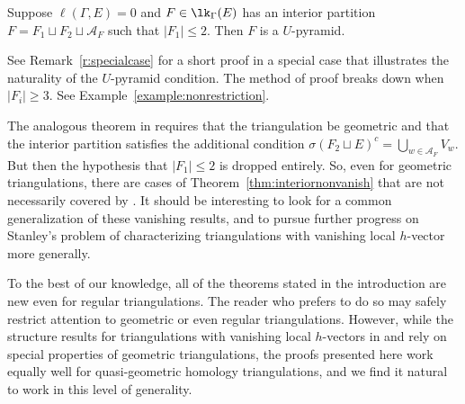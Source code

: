 \begin{theorem}\label{thm:interiornonvanish}
Suppose $\ell(\Gamma,E) = 0$ and $F \in \lk_\Gamma(E)$ has an interior partition $F = F_1 \sqcup F_2 \sqcup \mathcal{A}_F$ such that $|F_1| \leq 2$.  Then $F$ is a $U$-pyramid.
\end{theorem}

See Remark~\ref{r:specialcase} for a short proof in a special case that illustrates the naturality of the 
$U$-pyramid condition.
The method of proof breaks down when $|F_i| \geq 3$.  See Example~\ref{example:nonrestriction}.  


\begin{remark}
The analogous theorem in \cite{LarsonPayneStapledon} requires that the triangulation be geometric and that the interior partition satisfies the additional condition $\sigma(F_2 \sqcup E)^c = \bigcup_{w \in \mathcal{A}_F} V_w$.  But then the hypothesis that $|F_1| \leq 2$ is dropped entirely.  So, even for geometric triangulations, there are cases of Theorem~\ref{thm:interiornonvanish} that are not necessarily covered by \cite[Theorem~4.1.3]{LarsonPayneStapledon}. It should be interesting to look for a common generalization of these vanishing results, and to pursue further progress on Stanley's problem of characterizing triangulations with vanishing local $h$-vector more generally.
\end{remark}


\begin{remark}
To the best of our knowledge, all of the theorems stated in the introduction are new even for regular triangulations. The reader who prefers to do so may safely restrict attention to geometric or even regular triangulations.  However, while the structure results for triangulations with vanishing local $h$-vectors in \cite{dMGPSS20} and \cite{LarsonPayneStapledon} rely on special properties of geometric triangulations, the proofs presented here work equally well for quasi-geometric homology triangulations, and we find it  natural to work in this level of generality.
\end{remark}
